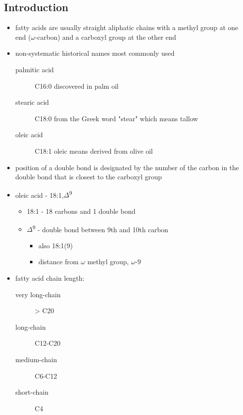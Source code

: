\documentclass{scrartcl}
\begin{document}
\subsection{Introduction}
\label{sec:org2924d8b}
\begin{itemize}
\item fatty acids are usually straight aliphatic chains with a methyl
group at one end (\(\omega\)-carbon) and a carboxyl group at the other
end
\end{itemize}


\begin{itemize}
\item non-systematic historical names most commonly used
\begin{description}
\item[{palmitic acid}] C16:0 discovered in palm oil
\item[{stearic acid}] C18:0 from the Greek word "stear" which means tallow
\item[{oleic acid}] C18:1 oleic means derived from olive oil
\end{description}
\item position of a double bond is designated by the number of the carbon in the double bond that is closest to the carboxyl group
\end{itemize}

\begin{itemize}
\item oleic acid - 18:1,\(\Delta\)\textsuperscript{9}
\begin{itemize}
\item 18:1 - 18 carbons and 1 double bond
\item \(\Delta\)\textsuperscript{9} - double bond between 9th and 10th carbon
\begin{itemize}
\item also 18:1(9)
\item distance from \(\omega\) methyl group, \(\omega\)-9
\end{itemize}
\end{itemize}

\item fatty acid chain length:
\begin{description}
\item[{very long-chain}] > C20
\item[{long-chain}] C12-C20
\item[{medium-chain}] C6-C12
\item[{short-chain}] C4
\end{description}
\end{itemize}
\end{document}
